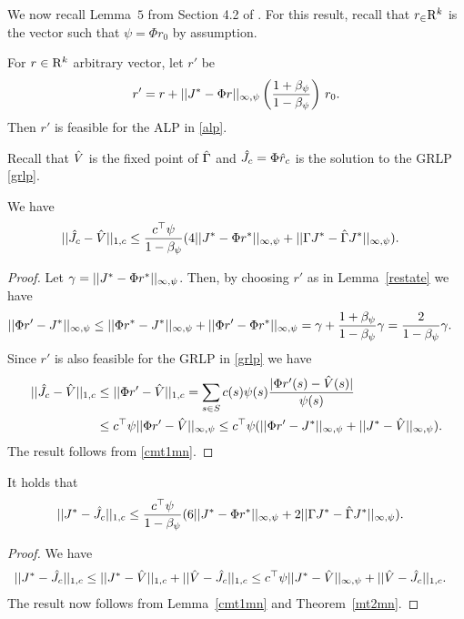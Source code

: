 We now recall Lemma~$5$ from Section 4.2 of \cite{ALP}. 
For this result, recall that $r_\in \mathrm{R}^k$ is the vector such that $\psi = \Phi r_0$ by assumption.
\begin{lemma}\label{restate}
For  $r \in \mathrm{R}^k$ arbitrary vector, let $r'$ be
\begin{align}
 r'= r+||J^*-\Phi r||_{\infty,\psi} \left(\frac{1+\beta_{\psi}}{1-\beta_{\psi}}\right)\, r_0.
\end{align}
Then $r'$ is feasible for the ALP in \eqref{alp}. 
\end{lemma}
Recall that $\hat{V}$ is the fixed point of $\hat{\Gamma}$ and $\hat{J}_c=\Phi \hat{r}_c$ is the solution to the GRLP
\eqref{grlp}. 
\begin{theorem}\label{mt2mn}
We have
\begin{align}
||\hat{J}_c-\hat{V}||_{1,c}&\leq \frac{c^\top \psi}{1-\beta_\psi}(4||J^*-\Phi r^*||_{\infty,\psi}
+||\Gamma J^*-\hat{\Gamma} J^*||_{\infty,\psi}).
\end{align}
\end{theorem}
\begin{proof}
Let $\gamma=||J^*-\Phi r^*||_{\infty,\psi}$. 
Then, by choosing $r'$ as in Lemma~\ref{restate} we have
\begin{align*}
||\Phi r'-J^*||_{\infty,\psi}&\leq ||\Phi r^*-J^*||_{\infty,\psi}+||\Phi r'-\Phi r^*||_{\infty,\psi}\nonumber
=\gamma+\frac{1+\beta_\psi}{1-\beta_\psi}\gamma\nonumber
=\frac{2}{1-\beta_\psi}\gamma.\nonumber
\end{align*}
Since $r'$ is also feasible for the GRLP in \eqref{grlp} we have
\begin{align}
||\hat{J}_c-\hat{V}||_{1,c}&\leq||\Phi r'-\hat{V}||_{1,c}\nonumber
=\sum_{s\in S}c(s)\psi(s)\frac{|\Phi r'(s)-\hat{V}(s)|}{\psi(s)}\nonumber\\
&\leq c^\top \psi ||\Phi r'-\hat{V}||_{\infty,\psi}\nonumber
\leq c^\top \psi (||\Phi r'-J^*||_{\infty,\psi}+||J^*-\hat{V}||_{\infty,\psi}).
\end{align}
The result follows from \cref{cmt1mn}.
\end{proof}
\begin{theorem}
\label{cmt2mn}
It holds that
\begin{align}\label{finalbndmn}
||J^*-\hj||_{1,c}&\leq\frac{c^\top\psi}{1-\beta_\psi}(6 ||J^*-\Phi r^*||_{\mn}
+2||\Gamma J^*-\hg J^*||_{\mn}).
\end{align}
\end{theorem}
\begin{proof}
We have
\begin{align}
||J^*-\hat{J}_c||_{1,c}
&\leq||J^*-\hat{V}||_{1,c}+||\hat{V}-\hat{J}_c||_{1,c}\nonumber
\leq c^\top \psi ||J^*-\hat{V}||_{\infty,\psi}+||\hat{V}-\hat{J}_c||_{1,c}.\nonumber
\end{align}
The result now follows from Lemma~\ref{cmt1mn} and Theorem~\ref{mt2mn}.
\end{proof}

